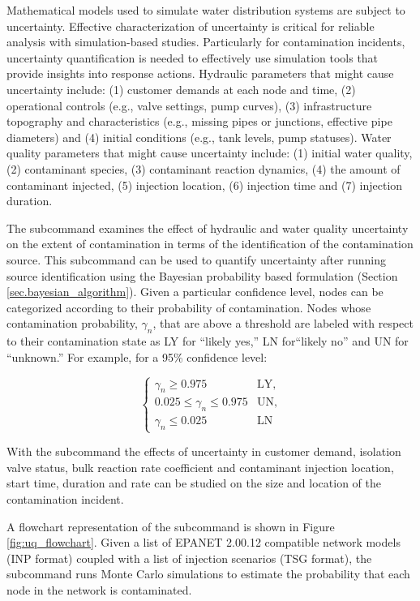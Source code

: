 Mathematical models used to simulate water distribution systems are subject to uncertainty. 
Effective characterization of uncertainty is critical for reliable analysis with simulation-based studies. 
Particularly for contamination incidents, uncertainty quantification is needed to effectively 
use simulation tools that provide insights into response actions. 
Hydraulic parameters that might cause uncertainty include: 
(1) customer demands at each node and time, (2) operational controls (e.g., valve settings, pump curves), (3) 
infrastructure topography and characteristics (e.g., missing pipes or junctions, effective pipe diameters) and (4) initial conditions (e.g., tank levels, pump statuses). 
Water quality parameters that might cause uncertainty include: 
(1)  initial water quality, (2) contaminant species, (3) contaminant reaction dynamics, (4) the amount
of contaminant injected, (5) injection location, (6) injection time and (7) injection duration.

The  subcommand examines the effect of hydraulic and water quality uncertainty on the extent of contamination in terms of the identification of the contamination source. 
This subcommand can be used to quantify uncertainty after running source identification using the Bayesian probability based formulation (Section \ref{sec.bayesian_algorithm}). Given a particular confidence level, nodes can be categorized according to their probability of contamination. Nodes whose contamination probability, $\gamma_n$, that are above a 
threshold are labeled with respect to their contamination state as LY for ``likely yes,'' LN for``likely no'' and UN for ``unknown.''  
For example, for a 95\% confidence level: 

\[ \left\{ \begin{array}{ll}
         \gamma_n \geq 0.975 & \mbox{LY},\\
        0.025\leq \gamma_n \leq 0.975 & \mbox{UN}, \\
        \gamma_n \leq 0.025 & \mbox{LN} \end{array} \right. 
\] 

With the  subcommand 
the effects of uncertainty in customer demand, isolation valve status, bulk reaction rate coefficient and 
contaminant injection location, start time, duration and rate can be studied on the size and location of the contamination incident.

A flowchart representation of the  subcommand is shown in Figure \ref{fig:uq_flowchart}. Given a list of EPANET 2.00.12 compatible network models (INP format) 
coupled with a list of injection scenarios (TSG format), the  subcommand
runs Monte Carlo simulations to estimate the probability that each node in the network is contaminated.

